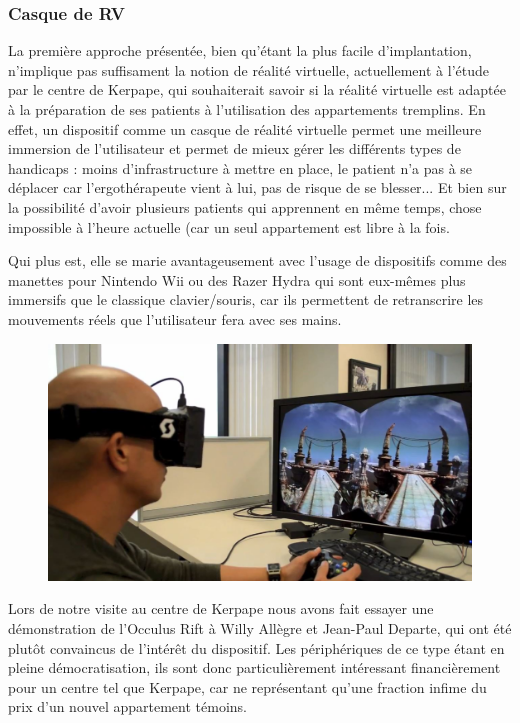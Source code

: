 \subsubsection{Casque de RV}
La première approche présentée, bien qu'étant la plus facile d'implantation, n'implique pas suffisament la notion de réalité virtuelle, actuellement à l'étude par le centre de Kerpape, qui souhaiterait savoir si la réalité virtuelle est adaptée à la préparation de ses patients à l’utilisation des appartements tremplins. 
En effet, un dispositif comme un casque de réalité virtuelle permet une meilleure immersion de l'utilisateur et permet de mieux gérer les différents types de handicaps : moins d'infrastructure à mettre en place, le patient n'a pas à se déplacer car l'ergothérapeute vient à lui, pas de risque de se blesser...
Et bien sur la possibilité d'avoir plusieurs patients qui apprennent en même temps, chose impossible à l'heure actuelle (car un seul appartement est libre à la fois. 

Qui plus est, elle se marie avantageusement avec l'usage de dispositifs comme des manettes pour Nintendo Wii ou des Razer Hydra qui sont eux-mêmes plus immersifs que le classique clavier/souris, car ils permettent de retranscrire les mouvements réels que l'utilisateur fera avec ses mains. \newline
\begin{figure}
  \centering
  \includegraphics[scale=0.3]{2-Specifications/img-utilisateur/occulus.jpg}
\end{figure}
Lors de notre visite au centre de Kerpape nous avons fait essayer une démonstration de l'Occulus Rift à Willy Allègre et Jean-Paul Departe, qui ont été plutôt convaincus de l'intérêt du dispositif. 
Les périphériques de ce type étant en pleine démocratisation, ils sont donc particulièrement intéressant financièrement pour un centre tel que Kerpape, car ne représentant qu'une fraction infime du prix d'un nouvel appartement témoins.

